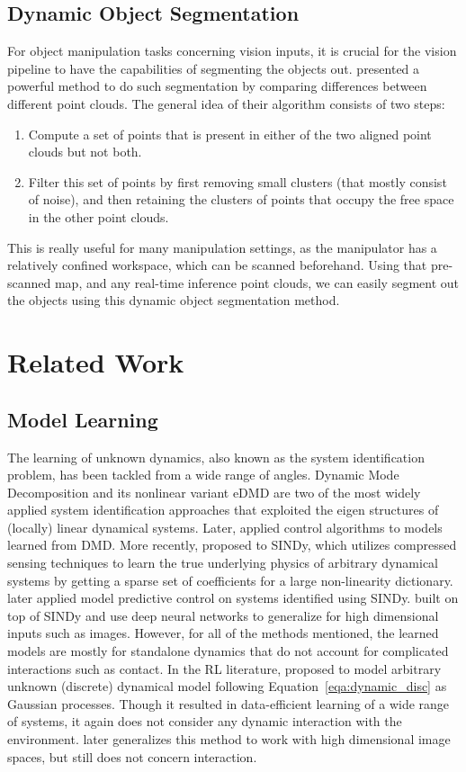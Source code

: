 \documentclass[conference]{IEEEtran}
\begin{document}
\subsection{Dynamic Object Segmentation}\label{sec:object_seg}
For object manipulation tasks concerning vision inputs, it is crucial for the
vision pipeline to have the capabilities of segmenting the objects out.
\citet{3d_detection} presented a powerful method to do such segmentation
by comparing differences between different point clouds. The general idea of
their algorithm consists of two steps:
\begin{enumerate}
  \item Compute a set of points that is present in either of the two aligned
    point clouds but not both.
  \item Filter this set of points by first removing small clusters
    (that mostly consist of noise), and then retaining the clusters of points that
    occupy the free space in the other point clouds.
\end{enumerate}
This is really useful for many manipulation settings, as the manipulator has a
relatively confined workspace, which can be scanned beforehand. Using that
pre-scanned map, and any real-time inference point clouds, we can easily segment
out the objects using this dynamic object segmentation method.

\section{Related Work}

\subsection{Model Learning}
The learning of unknown dynamics, also known as the system identification
problem, has been tackled from a wide range of angles. Dynamic Mode Decomposition
\cite{dmd} and its nonlinear variant eDMD \cite{edmd} are two of the most
widely applied system identification approaches that exploited the eigen
structures of (locally) linear dynamical systems. Later, \citet{dmdc} applied
control algorithms to models learned from DMD.
More recently, \citet{sindy} proposed to SINDy, which utilizes compressed
sensing techniques
to learn the true underlying physics of arbitrary dynamical systems by getting
a sparse set of coefficients for a large non-linearity dictionary. \citet{sindyc}
later applied model predictive control on systems identified using SINDy.
\citet{deepsindy} built on top of SINDy and use deep neural networks to
generalize for high dimensional inputs such as images. However,
for all of the methods mentioned, the learned models are mostly for
standalone dynamics that do not account for complicated interactions
such as contact.
In the RL literature, \citet{pilco} proposed to model arbitrary unknown
(discrete) dynamical model following Equation~\ref{eqa:dynamic_disc}
as Gaussian processes. Though it resulted in data-efficient learning of a wide range
of systems, it again does not consider any dynamic interaction with the
environment. \citet{deeppilco} later generalizes this method to work with
high dimensional image spaces, but still does not concern interaction.
\end{document}
